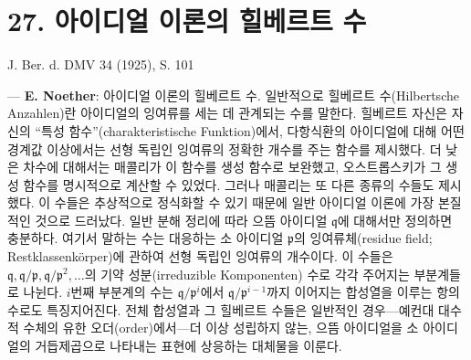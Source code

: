 \documentclass[11pt]{article}
\begin{document}
\section*{27. 아이디얼 이론의 힐베르트 수}

\begin{center}
J. Ber. d. DMV 34 (1925), S. 101
\end{center}

--- \textbf{E. Noether}: 아이디얼 이론의 힐베르트 수. 일반적으로 힐베르트 수(Hilbertsche Anzahlen)란 아이디얼의 잉여류를 세는 데 관계되는 수를 말한다. 힐베르트 자신은 자신의 ``특성 함수''(charakteristische Funktion)에서, 다항식환의 아이디얼에 대해 어떤 경계값 이상에서는 선형 독립인 잉여류의 정확한 개수를 주는 함수를 제시했다. 더 낮은 차수에 대해서는 매콜리가 이 함수를 생성 함수로 보완했고, 오스트롭스키가 그 생성 함수를 명시적으로 계산할 수 있었다. 그러나 매콜리는 또 다른 종류의 수들도 제시했다. 이 수들은 추상적으로 정식화할 수 있기 때문에 일반 아이디얼 이론에 가장 본질적인 것으로 드러났다. 일반 분해 정리에 따라 으뜸 아이디얼 $\mathfrak q$에 대해서만 정의하면 충분하다. 여기서 말하는 수는 대응하는 소 아이디얼 $\mathfrak p$의 잉여류체(residue field; Restklassenkörper)에 관하여 선형 독립인 잉여류의 개수이다. 이 수들은 $\mathfrak q,\mathfrak q/\mathfrak p,\mathfrak q/\mathfrak p^2,\ldots$의 기약 성분(irreduzible Komponenten) 수로 각각 주어지는 부분계들로 나뉜다. $i$번째 부분계의 수는 $\mathfrak q/\mathfrak p^i$에서 $\mathfrak q/\mathfrak p^{i-1}$까지 이어지는 합성열을 이루는 항의 수로도 특징지어진다. 전체 합성열과 그 힐베르트 수들은 일반적인 경우---예컨대 대수적 수체의 유한 오더(order)에서---더 이상 성립하지 않는, 으뜸 아이디얼을 소 아이디얼의 거듭제곱으로 나타내는 표현에 상응하는 대체물을 이룬다.
\end{document}
